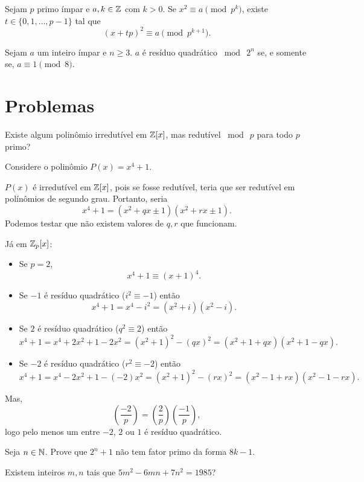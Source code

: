 \documentclass[10pt,a4paper]{article}
\newcommand{\leg}[2]{\left(\frac{#1}{#2}\right)}
\newcommand{\tmod}[1]{\bmod{\ #1}}
\begin{document}
	\begin{thm}
		Sejam $p$ primo ímpar e $a, k \in \mathbb{Z}$ com $k > 0$. Se $x^2 \equiv a \pmod{p^k}$, existe $t \in \{0, 1, \dots, p-1\}$ tal que \[(x+tp)^2 \equiv a \pmod{p^{k+1}}.\]
	\end{thm}
	\begin{thm}
		Sejam $a$ um inteiro ímpar e $n \ge 3$. $a$ é resíduo quadrático $\tmod{2^n}$ se, e somente se, $a \equiv 1 \pmod{8}$.
	\end{thm}


	\newpage
	\section{Problemas}
	\begin{prob}
		Existe algum polinômio irredutível em $\mathbb{Z}[x]$, mas redutível $\tmod{p}$ para todo $p$ primo?
	\end{prob}
	\begin{sol}
		Considere o polinômio $P(x) = x^4 + 1$.

		$P(x)$ é irredutível em $\mathbb{Z}[x]$, pois se fosse redutível, teria que ser redutível em polínômios de segundo grau. Portanto, seria \[x^4 + 1 = (x^2 + qx \pm 1)(x^2 + rx \pm 1).\] Podemos testar que não existem valores de $q, r$ que funcionam.

		Já em $\mathbb{Z}_p[x]$:
		\begin{itemize}
			\item Se $p = 2$, \[x^4 + 1 \equiv (x+1)^4.\]
			\item Se $-1$ é resíduo quadrático ($i^2 \equiv -1$) então \[x^4 + 1 = x^4 - i^2 = (x^2 + i)(x^2 - i).\]
			\item Se $2$ é resíduo quadrático ($q^2 \equiv 2$) então \[x^4 + 1 = x^4 + 2x^2 + 1 - 2x^2 = (x^2 + 1)^2 - (qx)^2 = (x^2 + 1 + qx)(x^2 + 1 - qx).\]
			\item Se $-2$ é resíduo quadrático ($r^2 \equiv -2$) então \[x^4 + 1 = x^4 - 2x^2 + 1 - (-2)x^2 = (x^2 + 1)^2 - (rx)^2 = (x^2 - 1 + rx)(x^2 - 1 - rx).\]
		\end{itemize}

		Mas, \[\leg{-2}{p} = \leg{2}{p} \leg{-1}{p},\]
		logo pelo menos um entre $-2$, $2$ ou $1$ é resíduo quadrático. 

	\end{sol}
	\begin{prob}
		Seja $n \in \mathbb{N}$. Prove que $2^n + 1$ não tem fator primo da forma $8k - 1$.
	\end{prob}
	\begin{prob}
		Existem inteiros $m, n$ tais que $5m^2 - 6mn + 7n^2 = 1985$?
	\end{prob}
\end{document}
